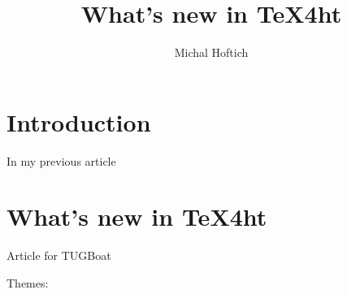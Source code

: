 \documentclass{ltugboat}
\title{What's new in \TeX4ht}
\author{Michal Hoftich}
\begin{document}
\maketitle

\begin{abstract}
\end{abstract}

\section{Introduction}

In my previous article \cite{hoftich19}

\hypertarget{Whatux27sux20newux20inux20TeX4ht}{%
\section{What's new in TeX4ht}\label{Whatux27sux20newux20inux20TeX4ht}}

Article for TUGBoat

Themes:
\end{document}
